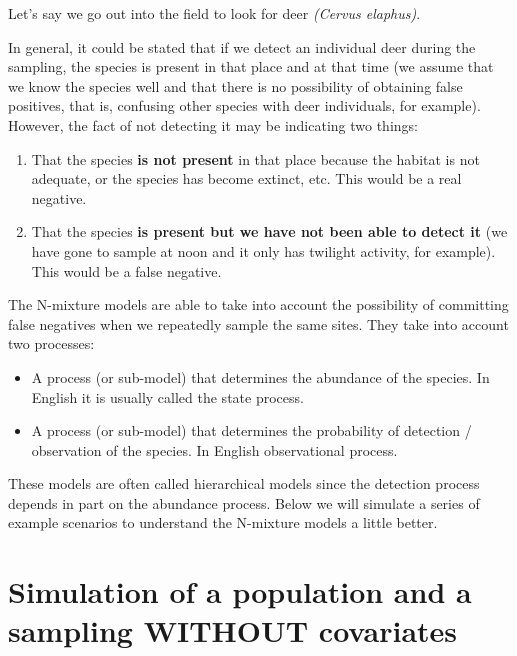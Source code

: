 \documentclass[
]{book}
\providecommand{\tightlist}{%
  \setlength{\itemsep}{0pt}\setlength{\parskip}{0pt}}
\begin{document}
\begin{col}{0.45\textwidth}
Let's say we go out into the field to look for deer \emph{(Cervus elaphus)}.

In general, it could be stated that if we detect an individual deer during the sampling, the species is present in that place and at that time (we assume that we know the species well and that there is no possibility of obtaining false positives, that is, confusing other species with deer individuals, for example). However, the fact of not detecting it may be indicating two things:

\begin{enumerate}
\def\labelenumi{\arabic{enumi}.}
\item
  That the species \textbf{is not present} in that place because the habitat is not adequate, or the species has become extinct, etc. This would be a real negative.
\item
  That the species \textbf{is present but we have not been able to detect it} (we have gone to sample at noon and it only has twilight activity, for example). This would be a false negative.
\end{enumerate}

The N-mixture models are able to take into account the possibility of committing false negatives when we repeatedly sample the same sites. They take into account two processes:

\begin{itemize}
\tightlist
\item
  A process (or sub-model) that determines the abundance of the species. In English it is usually called the state process.
\item
  A process (or sub-model) that determines the probability of detection / observation of the species. In English observational process.
\end{itemize}

These models are often called hierarchical models since the detection process depends in part on the abundance process. Below we will simulate a series of example scenarios to understand the N-mixture models a little better.

\end{col}

\hypertarget{simWithout}{%
\chapter{Simulation of a population and a sampling WITHOUT covariates}\label{simWithout}}
\end{document}
